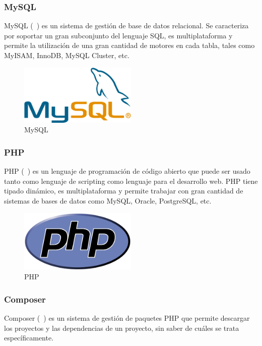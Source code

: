 \subsubsection*{MySQL}

MySQL (~\cite{mysql}) es un sistema de gestión de base de datos relacional. Se caracteriza por soportar un gran subconjunto del lenguaje SQL, es multiplataforma y permite la utilización de una gran cantidad de motores en cada tabla, tales como MyISAM, InnoDB, MySQL Cluster, etc.

\begin{figure}[tbh]
\centering
\label{fig:mysql}
\includegraphics[width=0.5\textwidth]{imagenes/MySQL}
\caption{MySQL}
\end{figure}

\subsubsection*{PHP}

PHP (~\cite{php}) es un lenguaje de programación de código abierto que puede ser usado tanto como lenguaje de scripting como lenguaje para el desarrollo web. PHP tiene tipado dinámico, es multiplataforma y permite trabajar con gran cantidad de sistemas de bases de datos como MySQL, Oracle, PostgreSQL, etc.

\begin{figure}[tbh]
\centering
\label{fig:php}
\includegraphics[width=0.5\textwidth]{imagenes/PHP}
\caption{PHP}
\end{figure}

\subsubsection*{Composer}

Composer (~\cite{composer}) es un sistema de gestión de paquetes PHP que permite descargar los proyectos y las dependencias de un proyecto, sin saber de cuáles se trata específicamente.

